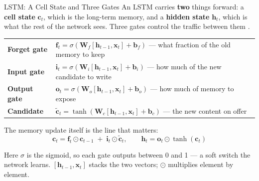 \documentclass[aspectratio=169, 11pt]{beamer}
\begin{document}
\begin{frame}{LSTM: A Cell State and Three Gates}
  An LSTM carries \textbf{two} things forward: a \textbf{cell state} $\mathbf{c}_t$, which is the
  long-term memory, and a \textbf{hidden state} $\mathbf{h}_t$, which is what the rest of the
  network sees. Three gates control the traffic between them
  \parencite{Hochreiter1997,Gers2000}.
  \begin{center}
    {\small
    \begin{tabular}{p{2.3cm}p{10.2cm}}
      \toprule
      \textbf{Forget gate} & $\mathbf{f}_t = \sigma(\mathbf{W}_f[\mathbf{h}_{t-1}, \mathbf{x}_t] + \mathbf{b}_f)$
        --- what fraction of the old memory to keep \\[3pt]
      \textbf{Input gate} & $\mathbf{i}_t = \sigma(\mathbf{W}_i[\mathbf{h}_{t-1}, \mathbf{x}_t] + \mathbf{b}_i)$
        --- how much of the new candidate to write \\[3pt]
      \textbf{Output gate} & $\mathbf{o}_t = \sigma(\mathbf{W}_o[\mathbf{h}_{t-1}, \mathbf{x}_t] + \mathbf{b}_o)$
        --- how much of memory to expose \\[3pt]
      \textbf{Candidate} & $\tilde{\mathbf{c}}_t = \tanh(\mathbf{W}_c[\mathbf{h}_{t-1}, \mathbf{x}_t] + \mathbf{b}_c)$
        --- the new content on offer \\
      \bottomrule
    \end{tabular}
    }
  \end{center}

  \vspace{-0.1cm}
  The memory update itself is the line that matters:
  \[
    \mathbf{c}_t = \mathbf{f}_t \odot \mathbf{c}_{t-1} \;+\; \mathbf{i}_t \odot \tilde{\mathbf{c}}_t,
    \qquad
    \mathbf{h}_t = \mathbf{o}_t \odot \tanh(\mathbf{c}_t)
  \]
  \vspace{-0.3cm}

  Here $\sigma$ is the sigmoid, so each gate outputs between 0 and 1 --- a soft switch the network
  learns. $[\mathbf{h}_{t-1}, \mathbf{x}_t]$ stacks the two vectors; $\odot$ multiplies element by
  element.
\end{frame}
\end{document}
